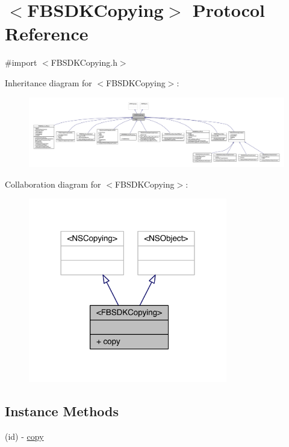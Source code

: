 \hypertarget{protocol_f_b_s_d_k_copying-p}{\section{$<$F\-B\-S\-D\-K\-Copying$>$ Protocol Reference}
\label{protocol_f_b_s_d_k_copying-p}
}


{\ttfamily \#import $<$F\-B\-S\-D\-K\-Copying.\-h$>$}



Inheritance diagram for $<$F\-B\-S\-D\-K\-Copying$>$\-:
\nopagebreak
\begin{figure}[H]
\begin{center}
\leavevmode
\includegraphics[width=350pt]{protocol_f_b_s_d_k_copying-p__inherit__graph}
\end{center}
\end{figure}


Collaboration diagram for $<$F\-B\-S\-D\-K\-Copying$>$\-:
\nopagebreak
\begin{figure}[H]
\begin{center}
\leavevmode
\includegraphics[width=246pt]{protocol_f_b_s_d_k_copying-p__coll__graph}
\end{center}
\end{figure}
\subsection*{Instance Methods}
\begin{DoxyCompactItemize}
\item 
(id) -\/ \hyperlink{protocol_f_b_s_d_k_copying-p_a93cd1625db2e893f0880c1093e4caf0c}{copy}
\end{DoxyCompactItemize}


